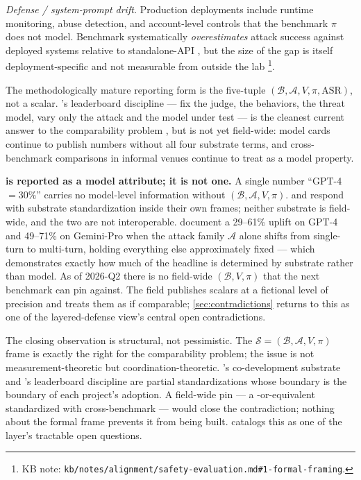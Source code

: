 \emph{Defense / system-prompt drift.} Production deployments include
runtime monitoring, abuse detection, and account-level controls
that the benchmark $\pi$ does not model. Benchmark  systematically
\emph{overestimates} attack success against deployed systems
relative to standalone-API , but the size of the gap is itself
deployment-specific and not measurable from outside the lab%
\footnote{KB note: \nolinkurl{kb/notes/alignment/safety-evaluation.md#1-formal-framing}.}.

The methodologically mature reporting form is the five-tuple
$(\mathcal{B}, \mathcal{A}, V, \pi, \mathrm{ASR})$, not a scalar.
's leaderboard discipline --- fix the judge, the
behaviors, the threat model, vary only the attack and the model
under test --- is the cleanest current answer to the comparability
problem
\citep[\S{}abstract]{chao2024-jailbreakbench}, but is not yet
field-wide: model cards continue to publish  numbers without
all four substrate terms, and cross-benchmark comparisons in
informal venues continue to treat  as a model property.

\begin{contradiction}
\textbf{ is reported as a model attribute; it is not one.}
A single number ``GPT-4  $= 30\%$'' carries no model-level
information without $(\mathcal{B}, \mathcal{A}, V, \pi)$.
\citet{harmbench2024} and \citet{chao2024-jailbreakbench} respond
with substrate standardization inside their own frames; neither
substrate is field-wide, and the two are not interoperable.
\citet{russinovich2024-crescendo} document a 29--61\% uplift on
GPT-4 and 49--71\% on Gemini-Pro when
the attack family $\mathcal{A}$ alone shifts from single-turn to
multi-turn, holding everything else approximately fixed --- which
demonstrates exactly how much of the headline  is determined by
substrate rather than model. As of 2026-Q2 there is no field-wide
$(\mathcal{B}, V, \pi)$ that the next benchmark can pin against.
The field publishes  scalars at a fictional level of precision
and treats them as if comparable; \cref{sec:contradictions} returns
to this as one of the layered-defense view's central open
contradictions.
\end{contradiction}

The closing observation is structural, not pessimistic. The
$\mathcal{S} = (\mathcal{B}, \mathcal{A}, V, \pi)$ frame is exactly
the right  for the comparability problem; the issue is
not measurement-theoretic but coordination-theoretic. 's
co-development substrate and 's leaderboard
discipline are partial standardizations whose boundary is the
boundary of each project's adoption. A field-wide pin --- a
-or-equivalent standardized  with cross-benchmark
 --- would close the contradiction; nothing about
the formal frame prevents it from being built. 
catalogs this as one of the layer's tractable open questions.

